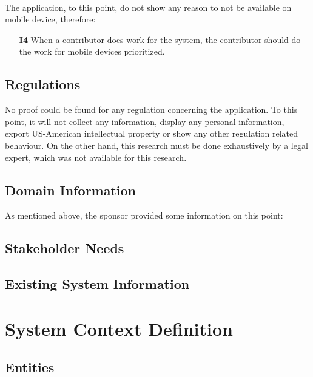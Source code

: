 \paragraph{} The application, to this point, do not show any reason to not be available on mobile device, therefore:

\begin{itemize}
    \item [\textbf{I4}] When a contributor does work for the system, the contributor should do the work for mobile devices prioritized.
\end{itemize}

\subsection{Regulations}
No proof could be found for any regulation concerning the application. To this point, it will not collect any information, display any personal information, export US-American intellectual property or show any other regulation related behaviour. On the other hand, this research must be done exhaustively by a legal expert, which was not available for this research.

\subsection{Domain Information}
As mentioned above, the sponsor provided some information on this point: 

\paragraph{}

\subsection{Stakeholder Needs}

\subsection{Existing System Information}


\section{System Context Definition}
\subsection{Entities}

